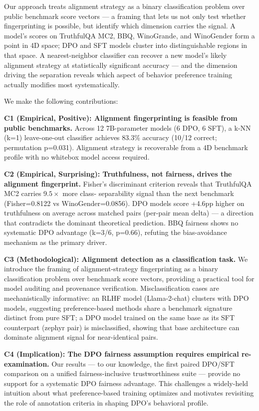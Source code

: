 Our approach treats alignment strategy as a binary classification problem over public
benchmark score vectors --- a framing that lets us not only test whether fingerprinting
is possible, but identify which dimension carries the signal. A model's scores on
TruthfulQA MC2, BBQ, WinoGrande, and WinoGender form a point in 4D space; DPO and
SFT models cluster into distinguishable regions in that space. A nearest-neighbor
classifier can recover a new model's likely alignment strategy at statistically significant
accuracy --- and the dimension driving the separation reveals which aspect of behavior
preference training actually modifies most systematically.

We make the following contributions:

\textbf{C1 (Empirical, Positive): Alignment fingerprinting is feasible from public benchmarks.}
Across 12 7B-parameter models (6 DPO, 6 SFT), a k-NN (k=1) leave-one-out classifier
achieves 83.3\% accuracy (10/12 correct; permutation p=0.031). Alignment strategy is
recoverable from a 4D benchmark profile with no whitebox model access required.

\textbf{C2 (Empirical, Surprising): Truthfulness, not fairness, drives the alignment fingerprint.}
Fisher's discriminant criterion reveals that TruthfulQA MC2 carries 9.$5\times$ more class-
separability signal than the next benchmark (Fisher=0.8122 vs WinoGender=0.0856).
DPO models score +4.6pp higher on truthfulness on average across matched pairs
(per-pair mean delta) --- a direction that contradicts the dominant theoretical prediction.
BBQ fairness shows no systematic DPO advantage (k=3/6, p=0.66), refuting the
bias-avoidance mechanism as the primary driver.

\textbf{C3 (Methodological): Alignment detection as a classification task.}
We introduce the framing of alignment-strategy fingerprinting as a binary classification
problem over benchmark score vectors, providing a practical tool for model auditing and
provenance verification. Misclassification cases are mechanistically informative: an
RLHF model (Llama-2-chat) clusters with DPO models, suggesting preference-based methods
share a benchmark signature distinct from pure SFT; a DPO model trained on the same
base as its SFT counterpart (zephyr pair) is misclassified, showing that base architecture
can dominate alignment signal for near-identical pairs.

\textbf{C4 (Implication): The DPO fairness assumption requires empirical re-examination.}
Our results --- to our knowledge, the first paired DPO/SFT comparison on a unified
fairness-inclusive trustworthiness suite --- provide no support for a systematic DPO
fairness advantage. This challenges a widely-held intuition about what preference-based
training optimizes and motivates revisiting the role of annotation criteria in shaping
DPO's behavioral profile.

